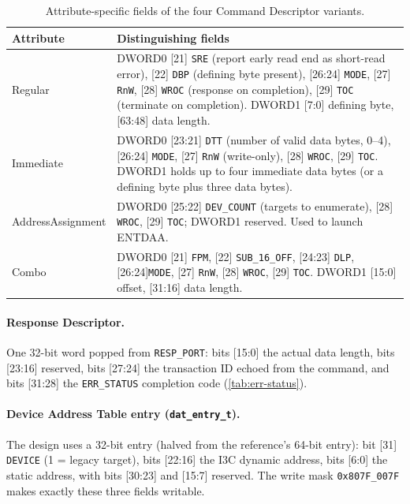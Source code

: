 \begin{table}[!htb]\centering
  \caption{Attribute-specific fields of the four Command Descriptor variants.}
  \label{tab:app-cmd-desc}
  \small
  \begin{tabular}{@{}l>{\raggedright\arraybackslash}p{}@{}}
    \toprule
    \textbf{Attribute} & \textbf{Distinguishing fields} \\
    \midrule
    Regular &
      DWORD0 [21] \texttt{SRE} (report early read end as short-read error), [22] \texttt{DBP}
      (defining byte present), [26:24] \texttt{MODE}, [27] \texttt{RnW}, [28] \texttt{WROC}
      (response on completion), [29] \texttt{TOC} (terminate on completion). DWORD1 [7:0]
      defining byte, [63:48] data length. \\
    \addlinespace
    Immediate &
      DWORD0 [23:21] \texttt{DTT} (number of valid data bytes, 0--4), [26:24] \texttt{MODE},
      [27] \texttt{RnW} (write-only), [28] \texttt{WROC}, [29] \texttt{TOC}. DWORD1 holds up
      to four immediate data bytes (or a defining byte plus three data bytes). \\
    \addlinespace
    AddressAssignment &
      DWORD0 [25:22] \texttt{DEV\_COUNT} (targets to enumerate), [28] \texttt{WROC},
      [29] \texttt{TOC}; DWORD1 reserved. Used to launch ENTDAA. \\
    \addlinespace
    Combo &
      DWORD0 [21] \texttt{FPM}, [22] \texttt{SUB\_16\_OFF}, [24:23] \texttt{DLP},
      [26:24]\footnotemark[1] \texttt{MODE}, [27] \texttt{RnW}, [28] \texttt{WROC},
      [29] \texttt{TOC}. DWORD1 [15:0] offset, [31:16] data length. \\
    \bottomrule
  \end{tabular}
\end{table}

\paragraph{Response Descriptor.} One 32-bit word popped from \texttt{RESP\_PORT}:
bits [15:0] the actual data length, bits [23:16] reserved, bits [27:24] the transaction ID
echoed from the command, and bits [31:28] the \texttt{ERR\_STATUS} completion code
(\cref{tab:err-status}).

\paragraph{Device Address Table entry (\texttt{dat\_entry\_t}).} The design uses a 32-bit
entry (halved from the reference's 64-bit entry): bit [31] \texttt{DEVICE} (1 = legacy
\iic{} target), bits [22:16] the I3C dynamic address, bits [6:0] the \iic{} static address,
with bits [30:23] and [15:7] reserved. The write mask \texttt{0x807F\_007F} makes exactly
these three fields writable.


